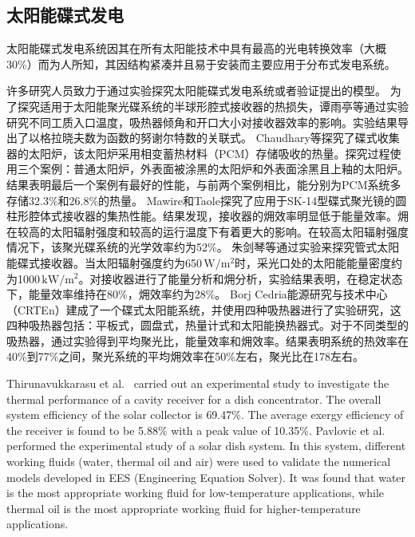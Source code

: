 \subsection{太阳能碟式发电}
\label{sec:pd}

太阳能碟式发电系统因其在所有太阳能技术中具有最高的光电转换效率（大概30\%）而为人所知，其因结构紧凑并且易于安装而主要应用于分布式发电系统。

许多研究人员致力于通过实验探究太阳能碟式发电系统或者验证提出的模型。
为了探究适用于太阳能聚光碟系统的半球形腔式接收器的热损失，谭雨亭等\cite{Tan2014b}通过实验研究不同工质入口温度，吸热器倾角和开口大小对接收器效率的影响。实验结果导出了以格拉晓夫数为函数的努谢尔特数的关联式。
Chaudhary等\cite{Chaudhary2013}探究了碟式收集器的太阳炉，该太阳炉采用相变蓄热材料（PCM）存储吸收的热量。探究过程使用三个案例：普通太阳炉，外表面被涂黑的太阳炉和外表面涂黑且上釉的太阳炉。结果表明最后一个案例有最好的性能，与前两个案例相比，能分别为PCM系统多存储32.3\%和26.8\%的热量。
Mawire和Taole\cite{Mawire2014}探究了应用于SK-14型碟式聚光镜的圆柱形腔体式接收器的集热性能。结果发现，接收器的㶲效率明显低于能量效率。㶲在较高的太阳辐射强度和较高的运行温度下有着更大的影响。在较高太阳辐射强度情况下，该聚光碟系统的光学效率约为52\%。
朱剑琴等\cite{Zhu2015}通过实验来探究管式太阳能碟式接收器。当太阳辐射强度约为650$\,\mathrm{W/m^2}$时，采光口处的太阳能能量密度约为1000$\,\mathrm{kW/m^2}$。对接收器进行了能量分析和㶲分析，实验结果表明，在稳定状态下，能量效率维持在80\%，㶲效率约为28\%。
Borj Cedria能源研究与技术中心（CRTEn）建成了一个碟式太阳能系统，并使用四种吸热器进行了实验研究，这四种吸热器包括：平板式，圆盘式，热量计式和太阳能换热器式。对于不同类型的吸热器，通过实验得到平均聚光比，能量效率和㶲效率。结果表明系统的热效率在40\%到77\%之间，聚光系统的平均㶲效率在50\%左右，聚光比在178左右。

Thirunavukkarasu et al.~\cite{Thirunavukkarasu2017} carried out an experimental study to investigate the thermal performance of a cavity receiver for a dish concentrator. The overall system efficiency of the solar collector is 69.47\%. The average exergy efficiency of the receiver is found to be 5.88\% with a peak value of 10.35\%.
Pavlovic et al.~\cite{Pavlovic2017} performed the experimental study of a solar dish system. In this system, different working fluids (water, thermal oil and air) were used to validate the numerical models developed in EES (Engineering Equation Solver). It was found that water is the most appropriate working fluid for low-temperature applications, while thermal oil is the most appropriate working fluid for higher-temperature applications.

